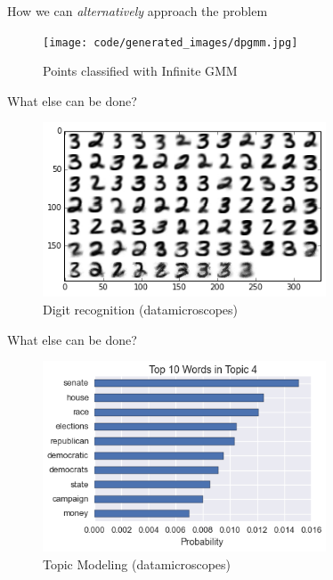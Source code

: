 \documentclass[handout]{beamer}
\begin{document}
\begin{frame}{How we can \textit{alternatively} approach the problem}
    {\centering
    \begin{figure}[H]
        \texttt{[image: code/generated\_images/dpgmm.jpg]}
        \caption{Points classified with Infinite GMM}
    \end{figure}
    }
\end{frame}

\begin{frame}{What else can be done?}
    {\centering
    \begin{figure}[H]
        \includegraphics[width=0.75\textwidth]{figures/mnist.png}
        \caption{Digit recognition (datamicroscopes)}
    \end{figure}
    }
\end{frame}

\begin{frame}{What else can be done?}
    {\centering
    \begin{figure}[H]
        \includegraphics[width=0.75\textwidth]{figures/topic_modeling.png}
        \caption{Topic Modeling (datamicroscopes)}
    \end{figure}
    }
\end{frame}
\end{document}
